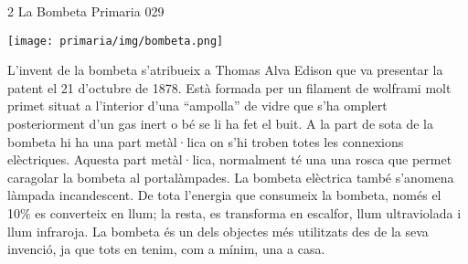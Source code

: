 \begin{news}
{2} %
{La Bombeta}
{}
{Primaria}
{029} %

\noindent\texttt{[image: primaria/img/bombeta.png]}

L’invent de la bombeta s’atribueix a Thomas Alva Edison que va presentar la patent  el 21 d’octubre de 1878. Està formada per un filament de wolframi molt primet situat a l’interior d’una “ampolla” de vidre que s’ha omplert posteriorment d’un gas inert o bé se li ha fet el buit. A la part de sota de la bombeta hi ha una part metàl·lica on s’hi troben totes les connexions elèctriques. Aquesta part metàl·lica, normalment té una una rosca que permet caragolar la bombeta al portalàmpades. La bombeta elèctrica també s’anomena làmpada incandescent.  De tota l’energia que consumeix la bombeta, només el 10\% es converteix en llum; la resta, es transforma en escalfor, llum ultraviolada i llum infraroja. 
La bombeta és un dels objectes més utilitzats des de la seva invenció, ja que tots en tenim, com a mínim, una a casa.


\end{news}

\newssep
